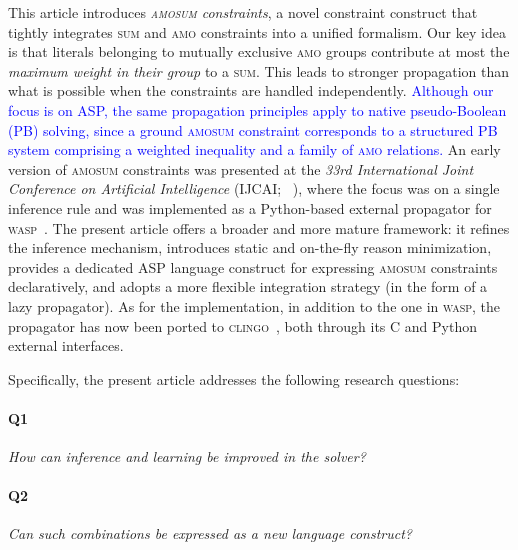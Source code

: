 \documentclass[preprint,authoryear]{elsarticle}
\theoremstyle{definition}
\begin{document}
This article introduces \emph{\textsc{amosum} constraints}, a novel constraint construct that tightly integrates \textsc{sum} and \textsc{amo} constraints into a unified formalism. 
Our key idea is that literals belonging to mutually exclusive \textsc{amo} groups contribute at most the \emph{maximum weight in their group} to a \textsc{sum}.
This leads to stronger propagation than what is possible when the constraints are handled independently.
\textcolor{blue}{Although our focus is on ASP, the same propagation principles apply to native pseudo-Boolean (PB) solving, since a ground \textsc{amosum} constraint corresponds to a structured PB system comprising a weighted inequality and a family of \textsc{amo} relations.}
%
An early version of \textsc{amosum} constraints was presented at the \emph{33rd International Joint Conference on Artificial Intelligence} (IJCAI; \citeauthor{DBLP:conf/ijcai/AlvianoDFM24}~\citeyear{DBLP:conf/ijcai/AlvianoDFM24}), where the focus was on a single inference rule and was implemented as a Python-based external propagator for \textsc{wasp}~\citep{DBLP:journals/tplp/DodaroR20}.  
The present article offers a broader and more mature framework: it refines the inference mechanism, introduces static and on-the-fly reason minimization, provides a dedicated ASP language construct for expressing \textsc{amosum} constraints declaratively, and adopts a more flexible integration strategy (in the form of a lazy propagator).  
As for the implementation, in addition to the one in \textsc{wasp}, the propagator has now been ported to \textsc{clingo}~\citep{DBLP:conf/iclp/GebserKKOSW16}, both through its C and Python external interfaces.  

Specifically, the present article addresses the following research questions:

\paragraph{Q1} \emph{How can inference and learning be improved in the solver?}

\paragraph{Q2} \emph{Can such combinations be expressed as a new language construct?}
\end{document}
